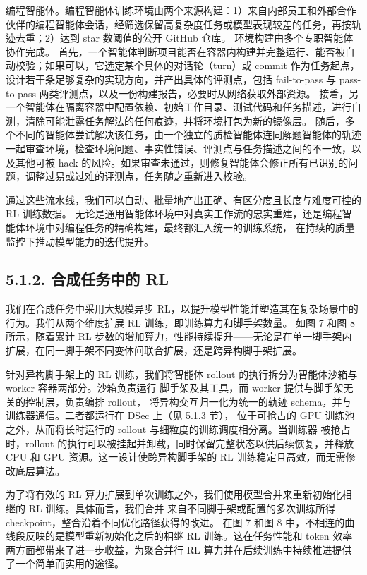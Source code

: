 编程智能体。编程智能体训练环境由两个来源构建：1）来自内部员工和外部合作伙伴的编程智能体会话，经筛选保留高复杂度任务或模型表现较差的任务，再按轨迹去重；2）达到 star 数阈值的公开 GitHub 仓库。
环境构建由多个专职智能体协作完成。
首先，一个智能体判断项目能否在容器内构建并完整运行、能否被自动校验；如果可以，它选定某个具体的对话轮（turn）或 commit 作为任务起点，设计若干条足够复杂的实现方向，并产出具体的评测点，包括 fail-to-pass 与 pass-to-pass 两类评测点，以及一份构建报告，必要时从网络获取外部资源。
接着，另一个智能体在隔离容器中配置依赖、初始工作目录、测试代码和任务描述，进行自测，清除可能泄露任务解法的任何痕迹，并将环境打包为新的镜像层。
随后，多个不同的智能体尝试解决该任务，由一个独立的质检智能体连同解题智能体的轨迹一起审查环境，检查环境问题、事实性错误、评测点与任务描述之间的不一致，以及其他可被 hack 的风险。如果审查未通过，则修复智能体会修正所有已识别的问题，调整过易或过难的评测点，任务随之重新进入校验。

通过这些流水线，我们可以自动、批量地产出正确、有区分度且长度与难度可控的 RL 训练数据。
无论是通用智能体环境中对真实工作流的忠实重建，还是编程智能体环境中对编程任务的精确构建，最终都汇入统一的训练系统，
在持续的质量监控下推动模型能力的迭代提升。

\subsection{5.1.2. 合成任务中的 RL}\label{rl-in-synthesized-tasks}

我们在合成任务中采用大规模异步 RL，以提升模型性能并塑造其在复杂场景中的行为。我们从两个维度扩展 RL 训练，即训练算力和脚手架数量。
如图 7 和图 8 所示，随着累计 RL 步数的增加算力，性能持续提升——无论是在单一脚手架内扩展，在同一脚手架不同变体间联合扩展，还是跨异构脚手架扩展。

针对异构脚手架上的 RL 训练，我们将智能体 rollout 的执行拆分为智能体沙箱与 worker 容器两部分。沙箱负责运行
脚手架及其工具，而 worker 提供与脚手架无关的控制层，负责编排 rollout，
将异构交互归一化为统一的轨迹 schema，并与训练器通信。二者都运行在 DSec 上（见 5.1.3 节），
位于可抢占的 GPU 训练池之外，从而将长时运行的 rollout 与细粒度的训练调度相分离。当训练器
被抢占时，rollout 的执行可以被挂起并卸载，同时保留完整状态以供后续恢复，并释放 CPU 和 GPU
资源。这一设计使跨异构脚手架的 RL 训练稳定且高效，而无需修改底层算法。





为了将有效的 RL 算力扩展到单次训练之外，我们使用模型合并来重新初始化相继的 RL 训练。具体而言，我们合并
来自不同脚手架或配置的多次训练所得 checkpoint，整合沿着不同优化路径获得的改进。
在图 7 和图 8 中，不相连的曲线段反映的是模型重新初始化之后的相继 RL 训练。这在任务性能和
token 效率两方面都带来了进一步收益，为聚合并行 RL 算力并在后续训练中持续推进提供了一个简单而实用的途径。

